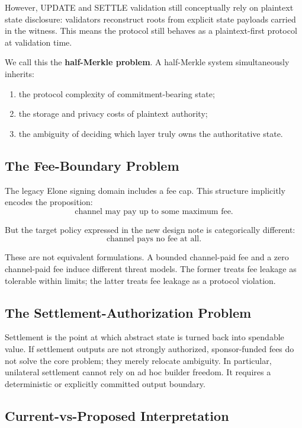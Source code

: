 \documentclass[11pt,a4paper]{article}
\begin{document}
However, UPDATE and SETTLE validation still conceptually rely on plaintext state disclosure: validators reconstruct roots from explicit state payloads carried in the witness. This means the protocol still behaves as a plaintext-first protocol at validation time.

We call this the \textbf{half-Merkle problem}. A half-Merkle system simultaneously inherits:
\begin{enumerate}
    \item the protocol complexity of commitment-bearing state;
    \item the storage and privacy costs of plaintext authority;
    \item the ambiguity of deciding which layer truly owns the authoritative state.
\end{enumerate}

\subsection{The Fee-Boundary Problem}

The legacy Elone signing domain includes a fee cap. This structure implicitly encodes the proposition:
\[
\text{channel may pay up to some maximum fee.}
\]

But the target policy expressed in the new design note is categorically different:
\[
\text{channel pays no fee at all.}
\]

These are not equivalent formulations. A bounded channel-paid fee and a zero channel-paid fee induce different threat models. The former treats fee leakage as tolerable within limits; the latter treats fee leakage as a protocol violation.

\subsection{The Settlement-Authorization Problem}

Settlement is the point at which abstract state is turned back into spendable value. If settlement outputs are not strongly authorized, sponsor-funded fees do not solve the core problem; they merely relocate ambiguity. In particular, unilateral settlement cannot rely on ad hoc builder freedom. It requires a deterministic or explicitly committed output boundary.

\subsection{Current-vs-Proposed Interpretation}
\end{document}
